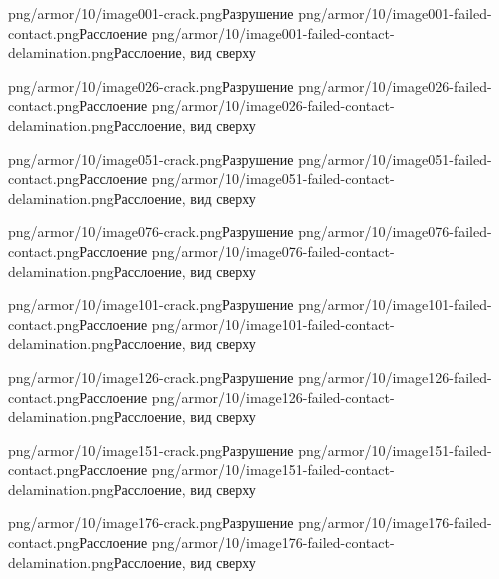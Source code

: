 \documentclass[thesis.tex]{subfiles}
\begin{document}
           {png/armor/10/image001-crack.png}{Разрушение}
           {png/armor/10/image001-failed-contact.png}{Расслоение}
           {png/armor/10/image001-failed-contact-delamination.png}{Расслоение, вид сверху}

           {png/armor/10/image026-crack.png}{Разрушение}
           {png/armor/10/image026-failed-contact.png}{Расслоение}
           {png/armor/10/image026-failed-contact-delamination.png}{Расслоение, вид сверху}

           {png/armor/10/image051-crack.png}{Разрушение}
           {png/armor/10/image051-failed-contact.png}{Расслоение}
           {png/armor/10/image051-failed-contact-delamination.png}{Расслоение, вид сверху}

           {png/armor/10/image076-crack.png}{Разрушение}
           {png/armor/10/image076-failed-contact.png}{Расслоение}
           {png/armor/10/image076-failed-contact-delamination.png}{Расслоение, вид сверху}

           {png/armor/10/image101-crack.png}{Разрушение}
           {png/armor/10/image101-failed-contact.png}{Расслоение}
           {png/armor/10/image101-failed-contact-delamination.png}{Расслоение, вид сверху}

           {png/armor/10/image126-crack.png}{Разрушение}
           {png/armor/10/image126-failed-contact.png}{Расслоение}
           {png/armor/10/image126-failed-contact-delamination.png}{Расслоение, вид сверху}

           {png/armor/10/image151-crack.png}{Разрушение}
           {png/armor/10/image151-failed-contact.png}{Расслоение}
           {png/armor/10/image151-failed-contact-delamination.png}{Расслоение, вид сверху}

           {png/armor/10/image176-crack.png}{Разрушение}
           {png/armor/10/image176-failed-contact.png}{Расслоение}
           {png/armor/10/image176-failed-contact-delamination.png}{Расслоение, вид сверху}
\end{document}
